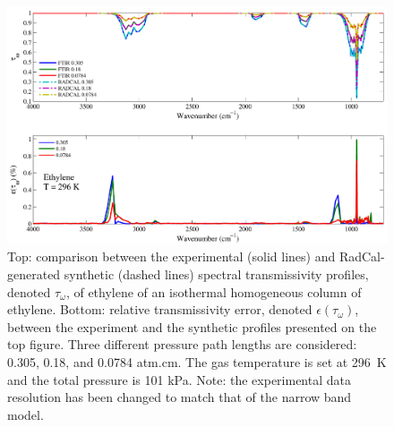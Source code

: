 \begin{figure}[h]
\includegraphics[width=\textwidth]{../Verification/Results_Test2/Ethylene_296.pdf}
\caption{Top: comparison between the experimental (solid lines) and RadCal-generated synthetic (dashed lines) spectral transmissivity profiles, denoted $\tau_{\omega}$, of ethylene of an isothermal homogeneous column of ethylene. Bottom: relative transmissivity error, denoted $\epsilon{(\tau_{\omega})}$, between the experiment and the synthetic profiles presented on the top figure. Three different pressure path lengths are considered: 0.305, 0.18, and 0.0784 atm.cm. The gas temperature is set at 296~K and the total pressure is 101 kPa. Note: the experimental data resolution has been changed to match that of the narrow band model. \label{fig:ethylene_Verify_296K}}
\end{figure}

\newpage

